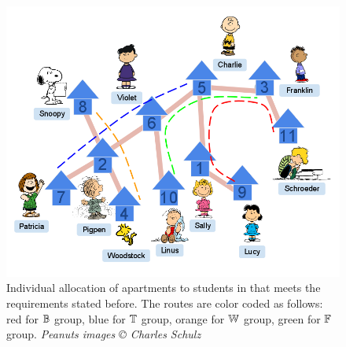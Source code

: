\documentclass[MS]             %
              {iitmdiss_as}    %
\begin{document}
\begin{figure}[htbp]
 \includegraphics[scale=0.5]{../img/3_infinite_loop.png}
  \caption{\figtabsize Individual allocation of apartments to students
    in {\residenceblock} that meets the requirements stated before.
    The routes are color coded as follows: red for
    \textcolor{red}{$\mathbb{B}$} group, blue for \textcolor{blue}{$\mathbb{T}$}
    group, orange for \textcolor{yellow}{$\mathbb{W}$} group, green
    for \textcolor{green}{$\mathbb{F}$} group. {\tiny {\em Peanuts images
        {\copyright} Charles Schulz}}}%
  \label{fig:streetmappathpeople}
\end{figure}

\end{document}
